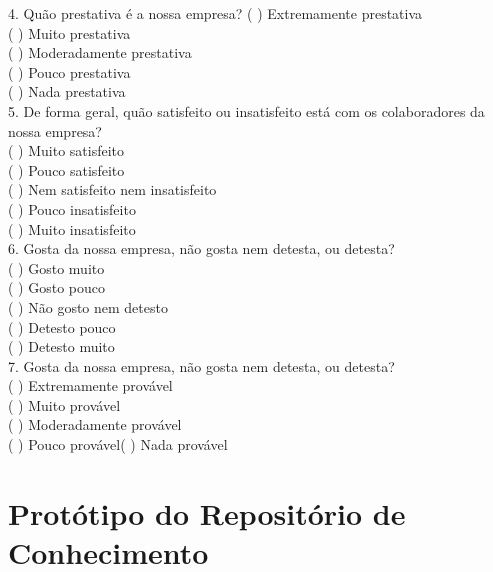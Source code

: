 \begin{apendicesenv}
4. Quão prestativa é a nossa empresa? ( ) Extremamente prestativa \\
( ) Muito prestativa \\
( ) Moderadamente prestativa \\
( ) Pouco prestativa \\
( ) Nada prestativa \\
 
5.  De forma geral, quão satisfeito ou insatisfeito está com os colaboradores da nossa empresa? \\
( ) Muito satisfeito \\
( ) Pouco satisfeito \\
( ) Nem satisfeito nem insatisfeito \\
( ) Pouco insatisfeito \\
( ) Muito insatisfeito \\
 
6. Gosta da nossa empresa, não gosta nem detesta, ou detesta? \\
( ) Gosto muito \\
( ) Gosto pouco \\
( ) Não gosto nem detesto \\
( ) Detesto pouco \\
( ) Detesto muito \\
 
7. Gosta da nossa empresa, não gosta nem detesta, ou detesta? \\
( ) Extremamente provável \\
( ) Muito provável \\
( ) Moderadamente provável \\
( ) Pouco provável( ) Nada provável\\


\chapter{Protótipo do Repositório de Conhecimento}


\end{apendicesenv}
